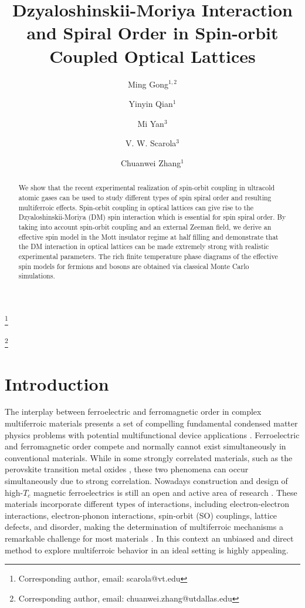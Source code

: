 \documentclass[a4paper,showpacs]{revtex4}
\begin{document}
\title{Dzyaloshinskii-Moriya Interaction and Spiral Order in Spin-orbit
Coupled Optical Lattices}
\author{Ming Gong$^{1,2}$}
\author{Yinyin Qian$^{1}$}
\author{Mi Yan$^{3}$}
\author{V. W. Scarola$^{3}$}
\thanks{Corresponding author, email: scarola@vt.edu}
\author{Chuanwei Zhang$^{1}$}
\thanks{Corresponding author, email: chuanwei.zhang@utdallas.edu}

\begin{abstract}
We show that the recent experimental realization of spin-orbit coupling in
ultracold atomic gases can be used to study different types of spin spiral order
and resulting multiferroic effects. Spin-orbit coupling in optical lattices
can give rise to the Dzyaloshinskii-Moriya (DM) spin interaction which is
essential for spin spiral order. By taking into account spin-orbit coupling
and an external Zeeman field, we derive an effective spin model in the Mott
insulator regime at half filling and demonstrate that the DM interaction in
optical lattices can be made extremely strong with realistic experimental
parameters. The rich finite temperature phase diagrams of the effective spin
models for fermions and bosons are obtained via classical Monte Carlo
simulations.
\end{abstract}

\maketitle
\section*{\bf Introduction}
\label{intro}
The interplay between ferroelectric and ferromagnetic order in complex
multiferroic materials presents a set of compelling fundamental condensed
matter physics problems with potential multifunctional device applications
\cite{reviews-1,reviews-2,reviews-3,reviews-4}. Ferroelectric and ferromagnetic order compete and normally
cannot exist simultaneously in conventional materials. While in some
strongly correlated materials, such as the perovskite transition metal
oxides \cite{MF-1, MF-2,MF-3,MF-4,MF-5,MF-6}, these two phenomena can occur
simultaneously due to strong correlation. Nowadays construction and design
of high-$T_{c}$ magnetic ferroelectrics is still an open and active area of
research \cite{Jing}. These materials incorporate different types of
interactions, including electron-electron interactions, electron-phonon
interactions, spin-orbit (SO) couplings, lattice defects, and disorder,
making the determination of multiferroic mechanisms a remarkable challenge
for most materials \cite{Sergienko,Katsura}. In this context an unbiased and
direct method to explore multiferroic behavior in an ideal setting is highly
appealing.
\end{document}
